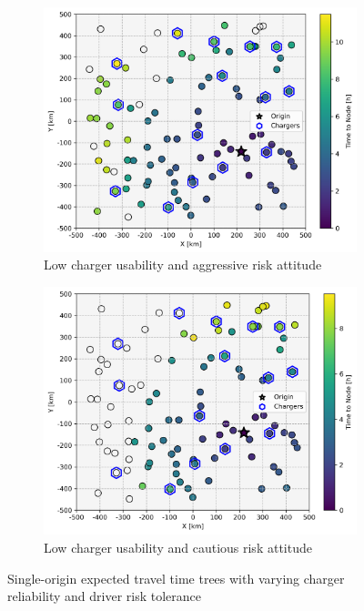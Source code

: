 \documentclass[11pt]{article}
\begin{document}
\begin{figure}[H]
\begin{subfigure}{.4\linewidth}
		\centering\includegraphics[width = \linewidth]{figs/interactions_la.png}
		\captionsetup{width=.8\linewidth}
		\caption{Low charger usability and aggressive risk attitude}
	\end{subfigure}%
	\begin{subfigure}{.4\linewidth}
		\centering\includegraphics[width = \linewidth]{figs/interactions_lc.png}
		\captionsetup{width=.8\linewidth}
		\caption{Low charger usability and cautious risk attitude}
	\end{subfigure}
	\caption{Single-origin expected travel time trees with varying charger reliability and driver risk tolerance}
	\label{fig:interactions}
\end{figure}
\end{document}
